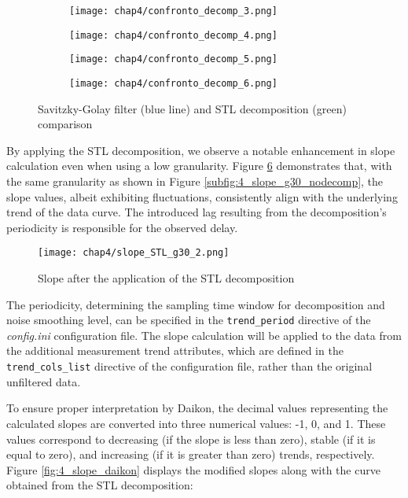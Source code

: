\begin{figure}[H]
	\centering
	\begin{subfigure}{0.48\textwidth}
		\texttt{[image: chap4/confronto\_decomp\_3.png]}
		\caption{}
		\label{subfig:4_smoothing1}
	\end{subfigure}
	\hfill
	\begin{subfigure}{0.48\textwidth}
		\texttt{[image: chap4/confronto\_decomp\_4.png]}
		\caption{}
		\label{subfig:4_smoothing2}
	\end{subfigure}
	\begin{subfigure}{0.48\textwidth}
		\texttt{[image: chap4/confronto\_decomp\_5.png]}
		\caption{}
		\label{subfig:4_smoothing3}
	\end{subfigure}
	\begin{subfigure}{0.48\textwidth}
		\texttt{[image: chap4/confronto\_decomp\_6.png]}
		\caption{}
		\label{subfig:4_smoothing4}
	\end{subfigure}
	\caption{Savitzky-Golay filter (blue line) and STL decomposition (green) comparison}
	\label{fig:4_smoothing_comparison}
\end{figure}

By applying the STL decomposition, we observe a notable enhancement in slope calculation even when using a low granularity. Figure \ref{fig:4_STL_decomp_results} demonstrates that, with the same granularity as shown in Figure \ref{subfig:4_slope_g30_nodecomp}, the slope values, albeit exhibiting fluctuations, consistently align with the underlying trend of the data curve. The introduced lag resulting from the decomposition's periodicity is responsible for the observed delay.

\begin{figure}[ht]
	\centering
	\texttt{[image: chap4/slope\_STL\_g30\_2.png]}
	\caption{Slope after the application of the STL decomposition}
	\label{fig:4_STL_decomp_results}
\end{figure}
The periodicity, determining the sampling time window for decomposition and noise smoothing level, can be specified in the \texttt{trend\_period} directive of the \textit{config.ini} configuration file.\newline
The slope calculation will be applied to the data from the additional measurement trend attributes, which are defined in the \texttt{trend\_cols\_list} directive of the configuration file, rather than the original unfiltered data.

\bigskip
To ensure proper interpretation by Daikon, the decimal values representing the calculated slopes are converted into three numerical values: -1, 0, and 1. These values correspond to decreasing (if the slope is less than zero), stable (if it is equal to zero), and increasing (if it is greater than zero) trends, respectively. Figure \ref{fig:4_slope_daikon} displays the modified slopes along with the curve obtained from the STL decomposition:

